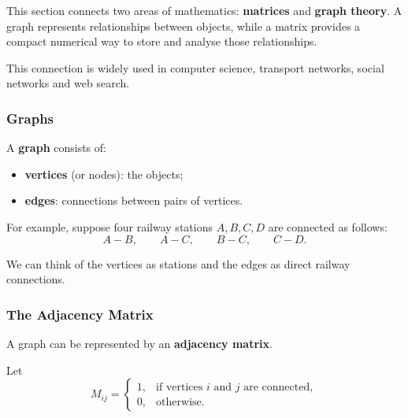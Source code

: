 

This section connects two areas of mathematics: \textbf{matrices} and \textbf{graph theory}. A graph represents relationships between objects, while a matrix provides a compact numerical way to store and analyse those relationships.

This connection is widely used in computer science, transport networks, social networks and web search.

\subsubsection*{Graphs}

A \textbf{graph} consists of:
\begin{itemize}[leftmargin=*]
    \item \textbf{vertices} (or nodes): the objects;
    \item \textbf{edges}: connections between pairs of vertices.
\end{itemize}

For example, suppose four railway stations $A, B, C, D$ are connected as follows:
\[ A-B, \qquad A-C, \qquad B-C, \qquad C-D. \]

\begin{center}
\end{center}

We can think of the vertices as stations and the edges as direct railway connections.

\subsubsection*{The Adjacency Matrix}

A graph can be represented by an \textbf{adjacency matrix}.

Let
\[
M_{ij} =
\begin{cases}
1, & \text{if vertices } i \text{ and } j \text{ are connected}, \\
0, & \text{otherwise}.
\end{cases}
\]

